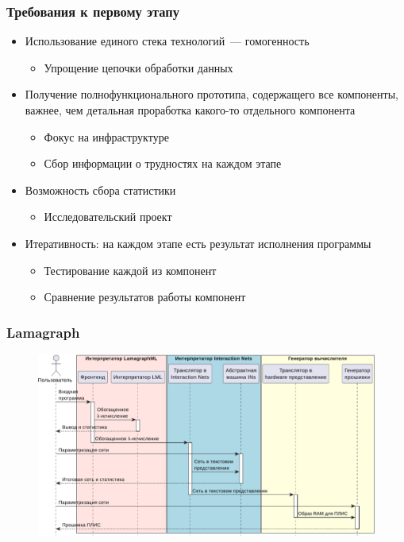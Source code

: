 \documentclass[aspectratio=169]{beamer}
\begin{document}
\begin{frame}
    \frametitle{Требования к первому этапу}

    \begin{itemize}
        \item Использование единого стека технологий~--- гомогенность
              \begin{itemize}
                  \item Упрощение цепочки обработки данных
              \end{itemize}
        \item Получение полнофункционального прототипа, содержащего все компоненты, важнее, чем детальная проработка какого-то отдельного компонента
              \begin{itemize}
                  \item Фокус на инфраструктуре
                  \item Сбор информации о трудностях на каждом этапе
              \end{itemize}
        \item Возможность сбора статистики
              \begin{itemize}
                  \item Исследовательский проект
              \end{itemize}
        \item Итеративность: на каждом этапе есть результат исполнения программы
              \begin{itemize}
                  \item Тестирование каждой из компонент
                  \item Сравнение результатов работы компонент
              \end{itemize}
    \end{itemize}

\end{frame}

\begin{frame}
    \frametitle{Lamagraph}

    \begin{figure}
        \includegraphics[width=0.9\linewidth]{pictures/using.pdf}
    \end{figure}

\end{frame}
\end{document}
